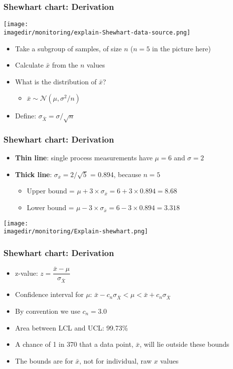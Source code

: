\begin{frame}\frametitle{Shewhart chart: Derivation}
	
	\texttt{[image: \\imagedir/monitoring/explain-Shewhart-data-source.png]}
	\begin{itemize}
		\item	Take a subgroup of samples, of size $n$ ($n=5$ in the picture here) 
		\item	Calculate $\bar{x}$ from the $n$ values 
		\item	What is the distribution of $\bar{x}$? 
		\begin{itemize}
			\item	$\bar{x} \sim \mathcal{N}(\mu, \sigma^2/n)$ 
		\end{itemize}
		\item	Define: $\sigma_{\bar{X}} = \sigma/\sqrt{n}$ 
	\end{itemize}
\end{frame}

\begin{frame}\frametitle{Shewhart chart: Derivation}
	\begin{itemize}
		\item	\textbf{Thin line}: single process measurements have $\mu = 6$ and $\sigma = 2$ 
		\item	\textbf{Thick line}: $\sigma_{\overline{x}} = 2/\sqrt{5}$ = 0.894, because $n=5$ 
		\begin{itemize}
			\item	Upper bound = $\mu + 3 \times \sigma_{\overline{x}} = 6 + 3\times 0.894 = 8.68$ 
			\item	Lower bound = $\mu - 3 \times \sigma_{\overline{x}} = 6 - 3\times 0.894 = 3.318$ 
		\end{itemize}
	\end{itemize}
	
	\texttt{[image: \\imagedir/monitoring/Explain-shewhart.png]}
\end{frame}

\begin{frame}\frametitle{Shewhart chart: Derivation}
	\begin{itemize}
		\item	z-value: $z = \dfrac{\bar{x} - \mu}{\sigma_{\bar{X}}}$ 
	\end{itemize}
	\begin{itemize}
		\item	Confidence interval for $\mu$: $\bar{x} - c_n\sigma_{\bar{X}} < \mu < \bar{x} + c_n\sigma_{\bar{X}}$ 
	\end{itemize}
	\begin{itemize}
		\item	By convention we use $c_n = 3.0$ 
		\item	Area between LCL and UCL: 99.73\% 
		\item	A chance of 1 in 370 that a data point, $\bar{x}$, will lie outside these bounds 
		\item	The bounds are for $\bar{x}$, not for individual, raw $x$ values 
	\end{itemize}
\end{frame}

